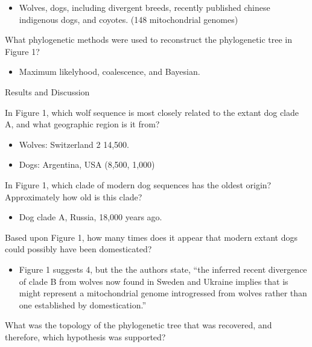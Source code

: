 \documentclass[12pt,a4paper]{article}
\begin{document}
\begin{itemize}
\begin{itemize}
                \begin{itemize}
                    \item Wolves, dogs, including divergent breeds, recently published chinese indigenous dogs, and coyotes. (148 mitochondrial genomes)
                \end{itemize}
            {\color{darklc} \item  What phylogenetic methods were used to reconstruct the phylogenetic tree in Figure 1?}
                \begin{itemize}
                    \item Maximum likelyhood, coalescence, and Bayesian.
                \end{itemize}
        \end{itemize}
    \item Results and Discussion
        \begin{itemize}
            {\color{darklc} \item In Figure 1, which wolf sequence is most closely related to the extant dog clade A, and what geographic region is it from?}
                \begin{itemize}
                    \item Wolves: Switzerland 2 14,500.
                    \item Dogs: Argentina, USA (8,500, 1,000) 
                \end{itemize}
            {\color{darklc} \item In Figure 1, which clade of modern dog sequences has the oldest origin? Approximately how old is this clade?}
                \begin{itemize}
                    \item Dog clade A, Russia, 18,000 years ago.
                \end{itemize}
            {\color{darklc} \item Based upon Figure 1, how many times does it appear that modern extant dogs could possibly have been domesticated?}
                \begin{itemize}
                    \item Figure 1 suggests 4, but the the authors state, {\color{G-Moon}``the inferred recent divergence of clade B from wolves now found in Sweden and Ukraine implies that is might represent a mitochondrial genome introgressed from wolves rather than one established by domestication.''}
                \end{itemize}
            {\color{darklc} \item What was the topology of the phylogenetic tree that was recovered, and therefore, which hypothesis was supported?}

\end{itemize}
\end{itemize}
\end{document}
